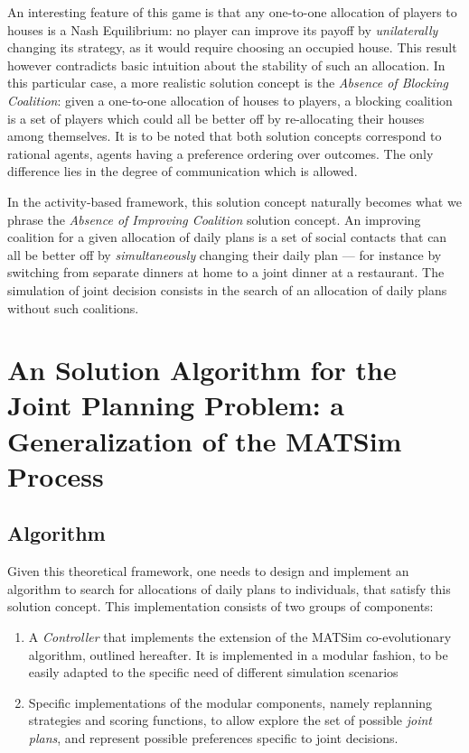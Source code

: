 {An interesting feature of this game is that any one-to-one allocation of players to houses is a
Nash Equilibrium: no player can improve its payoff by \emph{unilaterally} changing its strategy,
as it would require choosing an occupied house.
This result however contradicts basic intuition about the stability of such an allocation.
In this particular case, a more realistic solution concept is the \emph{Absence of Blocking Coalition}:
given a one-to-one allocation of houses to players, a blocking coalition is a set of players
which could all be better off by re-allocating their houses among themselves.
%
It is to be noted that both solution concepts correspond to rational agents, \ie agents having
a preference ordering over outcomes.
The only difference lies in the degree
of communication which is allowed.

In the activity-based framework, this solution concept naturally becomes what we phrase
the \emph{Absence of Improving Coalition} solution concept.
An improving coalition for a given allocation of daily plans
is a set of social contacts that can all be better off by \emph{simultaneously} changing
their daily plan
--- for instance by switching from separate dinners at home to a joint dinner at a restaurant.
The simulation of joint decision consists in the search of an allocation of daily plans
without such coalitions.



\section{An Solution Algorithm for the Joint Planning Problem: a Generalization of the MATSim Process\label{sec:td:algo}}

\subsection{Algorithm}

Given this theoretical framework, one needs to design and implement an
algorithm to search for allocations of daily plans to individuals, that
satisfy this solution concept.
This implementation consists of two
groups of components:

\begin{enumerate}
\item
  A \emph{Controller} that implements the extension of the MATSim
  co-evolutionary algorithm, outlined hereafter. It is implemented in a
  modular fashion, to be easily adapted to the specific need of
  different simulation scenarios
\item
  Specific implementations of the modular components,
  namely replanning strategies and scoring functions,
  to allow explore the set of possible \emph{joint plans},
  and represent possible preferences specific to joint decisions.
\end{enumerate}

}
